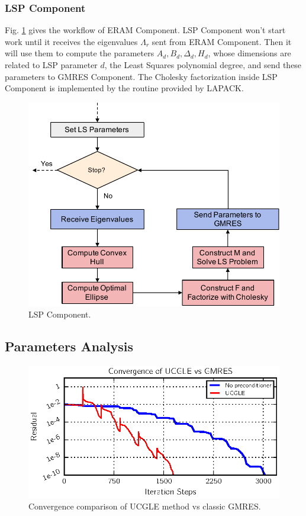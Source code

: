 \subsubsection{LSP Component}

Fig. \ref{ls-component} gives the workflow of ERAM Component. LSP Component won't start work until it receives the eigenvalues $\Lambda_r$ sent from ERAM Component. Then it will use them to compute the parameters $A_d, B_d, \Delta_d, H_d$, whose dimensions are related to LSP parameter $d$, the Least Squares polynomial degree, and send these parameters to GMRES Component. The Cholesky factorization inside LSP Component is implemented by the routine provided by LAPACK.

\begin{figure}[t]
	\centering
	\includegraphics[width=0.8\linewidth]{fig/LS-component.pdf}
	\caption{LSP Component.}
	\label{ls-component}
\end{figure}

\subsection{Parameters Analysis} \label{parameter analysis}
\begin{figure}[h]
	\centering
	\includegraphics[width=6.2in]{fig/conv.eps}
	\caption{Convergence comparison of UCGLE method vs classic GMRES.}
	\label{fig:conv}
\end{figure}

